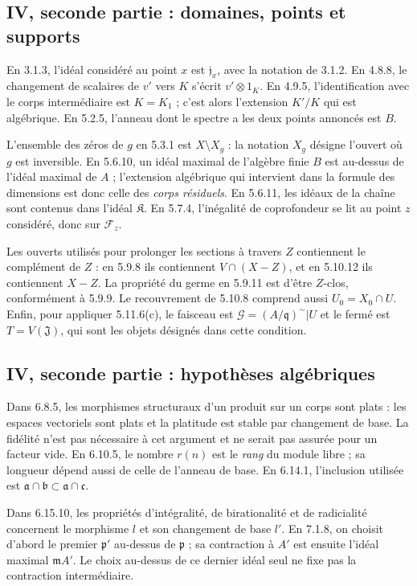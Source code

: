 \subsection{IV, seconde partie : domaines, points et supports}
\label{note:iv2-domains}
En 3.1.3, l'idéal considéré au point $x$ est $\mathfrak j_x$, avec la
notation de 3.1.2. En 4.8.8, le changement de scalaires de $v'$ vers
$K$ s'écrit $v'\otimes1_K$. En 4.9.5, l'identification avec le corps
intermédiaire est $K=K_1$ ; c'est alors l'extension $K'/K$ qui est
algébrique. En 5.2.5, l'anneau dont le spectre a les deux points annoncés
est $B$.

L'ensemble des zéros de $g$ en 5.3.1 est $X\setminus X_g$ : la notation
$X_g$ désigne l'ouvert où $g$ est inversible. En 5.6.10, un idéal maximal
de l'algèbre finie $B$ est au-dessus de l'idéal maximal de $A$ ; l'extension
algébrique qui intervient dans la formule des dimensions est donc celle
des \emph{corps résiduels}. En 5.6.11, les idéaux de la chaîne sont contenus
dans l'idéal $\mathfrak K$. En 5.7.4, l'inégalité de coprofondeur se lit
au point $z$ considéré, donc sur $\mathscr F_z$.

Les ouverts utilisés pour prolonger les sections à travers $Z$ contiennent
le complément de $Z$ : en 5.9.8 ils contiennent $V\cap(X-Z)$, et en 5.10.12
ils contiennent $X-Z$. La propriété du germe en 5.9.11 est d'être
$Z$-clos, conformément à 5.9.9. Le recouvrement de 5.10.8 comprend aussi
$U_0=X_0\cap U$. Enfin, pour appliquer 5.11.6(c), le faisceau est
$\mathcal G=(A/\mathfrak q)^\sim|U$ et le fermé est $T=V(\mathfrak J)$,
qui sont les objets désignés dans cette condition.

\subsection{IV, seconde partie : hypothèses algébriques}
\label{note:iv2-flatness}
Dans 6.8.5, les morphismes structuraux d'un produit sur un corps sont
plats : les espaces vectoriels sont plats et la platitude est stable par
changement de base. La fidélité n'est pas nécessaire à cet argument et
ne serait pas assurée pour un facteur vide. En 6.10.5, le nombre $r(n)$
est le \emph{rang} du module libre ; sa longueur dépend aussi de celle
de l'anneau de base. En 6.14.1, l'inclusion utilisée est
$\mathfrak a\cap\mathfrak b\subset\mathfrak a\cap\mathfrak c$.

Dans 6.15.10, les propriétés d'intégralité, de birationalité et de
radicialité concernent le morphisme $l$ et son changement de base $l'$.
En 7.1.8, on choisit d'abord le premier $\mathfrak p'$ au-dessus de
$\mathfrak p$ ; sa contraction à $A'$ est ensuite l'idéal maximal
$\mathfrak mA'$. Le choix au-dessus de ce dernier idéal seul ne fixe pas
la contraction intermédiaire.

